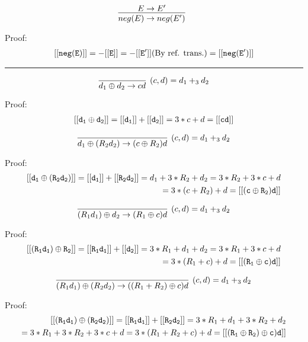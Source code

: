 \documentclass{article}
\begin{document}
\begin{enumerate}
\[
\infer[]
  {neg(E) \rightarrow neg(E')}
  {E \rightarrow E'}
\]

Proof:
\begin{align}
\mathtt{[[{neg(E)}]]}  
            =  -\mathtt{[[{E}]]} 
            =  -\mathtt{[[{E'}]]}  \text{(By ref. trans.)}  
            = \mathtt{[[{neg(E')}]]} 
\end{align}

\hrule

\[
\infer[(c, d) = d_{1} +_3 d_{2}] 
  {d_{1} \oplus d_{2} \rightarrow cd}
  {}  
\]

Proof:
\begin{align}
\mathtt{[[{d_{1} \oplus d_{2}}]]}  
            = \mathtt{[[{d_{1}}]]} + \mathtt{[[{d_{2}}]]} 
            = 3 * c + d              
            = \mathtt{[[{cd}]]} 
\end{align}

\[
\infer[(c, d) = d_{1} +_3 d_{2}] 
  {d_{1} \oplus (R_{2} d_{2}) \rightarrow (c \oplus R_{2}) d}
  {}  
\]

Proof:
\begin{align}
\mathtt{[[{d_{1} \oplus (R_{2} d_{2})}]]}  
            = \mathtt{[[{d_{1}}]]} + \mathtt{[[{R_{2} d_{2}}]]} 
            = d_{1} + 3 * R_{2} + d_{2}
            = 3 * R_{2} +  3 * c + d \\
            = 3 * (c + R_{2}) + d
            = \mathtt{[[{(c \oplus R_{2}) d}]]}       
\end{align}

\[
\infer[(c, d) = d_{1} +_3 d_{2}] 
  {(R_{1} d_{1}) \oplus d_{2}  \rightarrow (R_{1} \oplus c) d}
  {}  
\]

Proof:
\begin{align}
\mathtt{[[{(R_{1} d_{1}) \oplus R_{2}}]]}  
            = \mathtt{[[{R_{1} d_{1}}]]} + \mathtt{[[{d_{2}}]]} 
            = 3 * R_{1} + d_{1} + d_{2}
            = 3 * R_{1} +  3 * c + d \\
            = 3 * (R_{1} + c) + d
            = \mathtt{[[{(R_{1} \oplus c) d}]]}       
\end{align}

\[
\infer[(c, d) = d_{1} +_3 d_{2}] 
  {(R_{1} d_{1}) \oplus (R_{2} d_{2}) \rightarrow ((R_{1} + R_{2}) \oplus c) d}
  {}  
\]

Proof:
\begin{align}
\mathtt{[[{(R_{1} d_{1}) \oplus (R_{2} d_{2})}]]}  
            = \mathtt{[[{R_{1} d_{1}}]]} + \mathtt{[[{R_{2} d_{2}}]]} 
            = 3 * R_{1} + d_{1} + 3 * R_{2} + d_{2} \\
            = 3 * R_{1} +  3 * R_{2} + 3 * c + d 
            = 3 * (R_{1} + R_{2} + c) + d
            = \mathtt{[[{(R_{1} \oplus R_{2}) \oplus c) d}]]}       
\end{align}


\end{enumerate}
\end{document}
